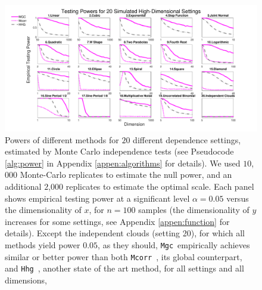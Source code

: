 \documentclass[11pt]{article}
\providecommand{\sct}[1]{{\sc \texttt{#1}}}
\providecommand{\mb}[1]{\boldsymbol{#1}}
\newcommand{\Mgc}{\sct{Mgc}}
\newcommand{\Mgcm}{\sct{Mgc$_M$}}
\newcommand{\Hhg}{\sct{Hhg}}
\newcommand{\Mcorr}{\sct{Mcorr}}
\newcommand{\mbx}{\ensuremath{\mb{x}}}
\newcommand{\mby}{\ensuremath{\mb{y}}}
\begin{document}
\begin{figure}[htbp]
\includegraphics[width=1.0\textwidth]{../Figures/FigHDPower}
\caption{Powers of different methods for $20$ different dependence settings, estimated by Monte Carlo independence tests (see Pseudocode \ref{alg:power} in Appendix \ref{appen:algorithms} for details).  We used $10$,$000$ Monte-Carlo replicates to estimate the null power, and an additional $2$,$000$  replicates to estimate the optimal scale.
Each panel shows empirical testing power at a significant level $\alpha=0.05$
versus the dimensionality of $x$, for $n=100$ samples (the dimensionality of $y$ increases for some settings, see Appendix \ref{appen:function} for details). 
Except the independent clouds (setting 20), for which all methods yield power $0.05$, as they should, \Mgc~empirically achieves similar or better power than both \Mcorr~\cite{SzekelyRizzo2013a}, its global counterpart, and \Hhg~\cite{HellerGorfine2013}, another state of the art method, for all settings and all dimensions, 
}
\label{f:nD}
\end{figure}




\end{document}
